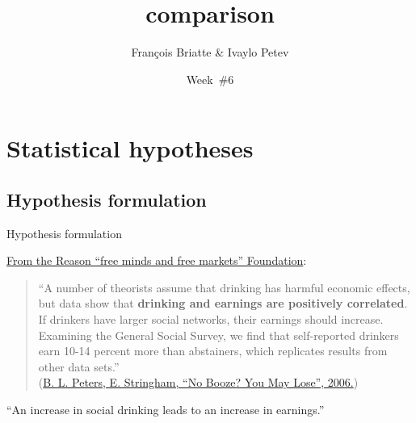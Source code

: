 \documentclass[t]{beamer}
\title{comparison}
\author{François Briatte \& Ivaylo Petev}
\date{Week~\#6}
\begin{document}

  \section{Statistical hypotheses}

  \subsection{Hypothesis formulation}

  \begin{frame}[c, plain]{}
  \end{frame}

  \begin{frame}[t]{Hypothesis formulation}
    
    \href{http://reason.org/}{From the Reason ``free minds and free markets'' Foundation}:\\[1em]

    \begin{quote}
    ``A number of theorists assume that drinking has harmful economic effects, but data show that \textbf{drinking and earnings are positively correlated}. \textbf{} If drinkers have larger social networks, their earnings should increase. Examining the General Social Survey, we find that self-reported drinkers earn 10-14 percent more than abstainers, which replicates results from other data sets.''\\[1em]
    
    (\href{http://reason.org/news/show/127594.html}{B. L. Peters, E. Stringham, ``No Booze? You May Lose'', 2006.})
    \end{quote}

     ``An increase in social drinking leads to an increase in earnings.''
  \end{frame}
  
\end{document}

